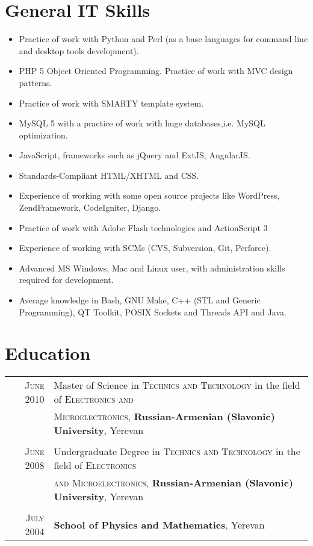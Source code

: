 \documentclass[a4paper,10pt]{article}
\begin{document}
\section{General IT Skills}
\begin{itemize}
  \item[] Practice of work with Python and Perl (as a base languages for
  command line and desktop tools development).

	\item[] PHP 5 Object Oriented Programming. Practice of work with MVC design
	patterns.

	\item[] Practice of work with SMARTY template system.

	\item[] MySQL 5 with a practice of work with huge databases,i.e. MySQL
		optimization.

	\item[] JavaScript, frameworks such as jQuery and ExtJS, AngularJS.

	\item[] Standards-Compliant HTML/XHTML and CSS.

	\item[] Experience of working with some open source projects like WordPress,
		ZendFramework, CodeIgniter, Django.

	\item[] Practice of work with Adobe Flash technologies and
		ActionScript 3

	\item[] Experience of working with SCMs (CVS, Subversion, Git, Perforce).

  \item[] Advanced MS Windows, Mac and Linux user, with administration skills
    required for development.

	\item[] Average knowledge in Bash, GNU Make, C++ (STL and Generic
		Programming), QT Toolkit, POSIX Sockets and Threads API and Java.
\end{itemize}

\section{Education}
\begin{tabular}{rl}
\textsc{June} 2010 & Master of Science in \textsc{Technics and Technology}
 in the field of \textsc{Electronics and} \\ & \textsc{Microelectronics}, 
\textbf{Russian-Armenian (Slavonic) University}, Yerevan\\ 
&\\
\textsc{June} 2008 & Undergraduate Degree in \textsc{Technics and Technology}
 in the field of \textsc{Electronics} \\ & \textsc{and Microelectronics}, 
\textbf{Russian-Armenian (Slavonic) University}, Yerevan\\
&\\
\textsc{July} 2004& \textbf{School of Physics and Mathematics}, Yerevan
\end{tabular}
\end{document}
